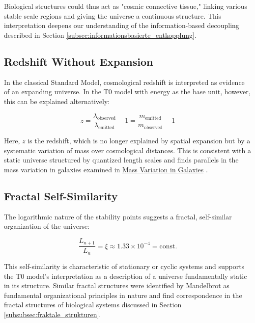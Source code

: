 \documentclass[12pt,a4paper]{article}
\begin{document}
		Biological structures could thus act as "cosmic connective tissue," linking various stable scale regions and giving the universe a continuous structure. This interpretation deepens our understanding of the information-based decoupling described in Section \ref{subsec:informationsbasierte_entkopplung}.
		
		\subsection{Redshift Without Expansion}
		\label{subsec:rotverschiebung}
		
		In the classical Standard Model, cosmological redshift is interpreted as evidence of an expanding universe. In the T0 model with energy as the base unit, however, this can be explained alternatively:
		
		\begin{equation}
			\label{eq:rotverschiebung}
			z = \frac{\lambda_{\text{observed}}}{\lambda_{\text{emitted}}} - 1 = \frac{m_{\text{emitted}}}{m_{\text{observed}}} - 1
		\end{equation}
		
		Here, $z$ is the redshift, which is no longer explained by spatial expansion but by a systematic variation of mass over cosmological distances. This is consistent with a static universe structured by quantized length scales and finds parallels in the mass variation in galaxies examined in \href{https://github.com/jpascher/T0-Time-Mass-Duality/blob/main/2/pdf/English/MassVarGalaxienEn.pdf}{Mass Variation in Galaxies} \cite{pascher_mass_var_2025}.
		
		\subsection{Fractal Self-Similarity}
		\label{subsec:fraktale_selbstaehnlichkeit}
		
		The logarithmic nature of the stability points suggests a fractal, self-similar organization of the universe:
		
		\begin{equation}
			\label{eq:selbstaehnlichkeit}
			\frac{L_{n+1}}{L_n} = \xi \approx 1.33 \times 10^{-4} = \text{const.}
		\end{equation}
		
		This self-similarity is characteristic of stationary or cyclic systems and supports the T0 model's interpretation as a description of a universe fundamentally static in its structure. Similar fractal structures were identified by Mandelbrot \cite{mandelbrot1983} as fundamental organizational principles in nature and find correspondence in the fractal structures of biological systems discussed in Section \ref{subsubsec:fraktale_strukturen}.
		
\end{document}
